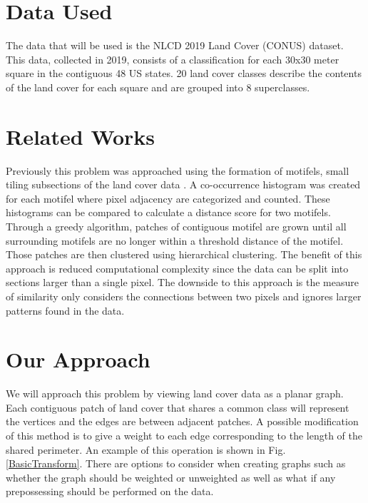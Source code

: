 \documentclass[conference]{IEEEtran}
\begin{document}
	\section{Data Used}
	The data that will be used is the NLCD 2019 Land Cover (CONUS) dataset. This data, collected in
	2019, consists of a classification for each 30x30 meter square in the contiguous 48 US states.
	20 land cover classes describe the contents of the land cover for each square and are grouped into 8 superclasses. \cite{NLCD2019LandCover}
	
	\section{Related Works}
	Previously this problem was approached using the formation of motifels, small tiling subsections of the land cover data \cite{doi:10.1080/13658816.2015.1134796}. A co-occurrence histogram was created for each motifel where pixel adjacency are categorized and counted. These histograms can be compared to calculate a distance score for two motifels. Through a greedy algorithm, patches of contiguous motifel are grown until all surrounding motifels are no longer within a threshold distance of the motifel. Those patches are then clustered using hierarchical clustering. The benefit of this approach is reduced computational complexity since the data can be split into sections larger than a single pixel. The downside to this approach is the measure of similarity only considers the connections between two pixels and ignores larger patterns found in the data.
	
	
	\section{Our Approach}
	We will approach this problem by viewing land cover data as a planar graph. Each contiguous patch of land cover that shares a common class will represent the vertices and the edges are between adjacent patches. A possible modification of this method is to give a weight to each edge corresponding to the length of the shared perimeter. An example of this operation is shown in Fig. \ref{BasicTransform}. There are options to consider when creating graphs such as whether the graph should be weighted or unweighted as well as what if any prepossessing should be performed on the data.
	
\end{document}
